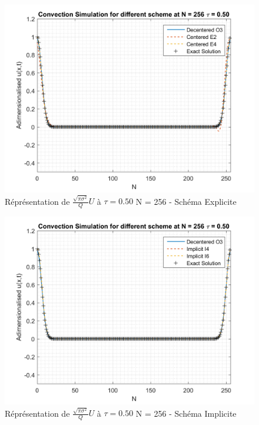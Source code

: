 \documentclass{article}
\begin{document}
\begin{figure}[H]
    \centering
    \includegraphics[scale=0.45]{img/fig4b1.png}
    \caption{Réprésentation de $\frac{\sqrt{\pi \sigma^2}}{Q} U$ à $\tau = 0.50$ N = 256 - Schéma Explicite}
    \label{fig4b1}
\end{figure}
\begin{figure}[H]
    \centering
    \includegraphics[scale=0.45]{img/fig4b2.png}
    \caption{Réprésentation de $\frac{\sqrt{\pi \sigma^2}}{Q} U$ à $\tau = 0.50$ N = 256 - Schéma Implicite}
    \label{fig4b2}
\end{figure}
\end{document}
